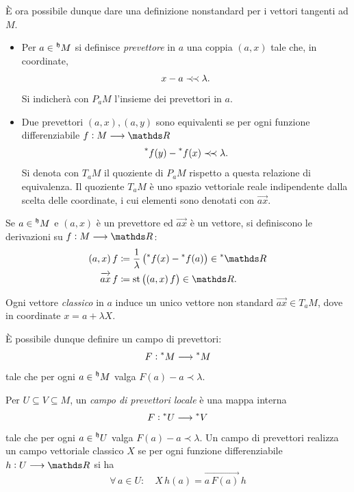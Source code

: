 È ora possibile dunque dare una definizione nonstandard per i vettori tangenti ad $ M $.\begin{itemize}
    \item Per $ a \in \prescript{\mathfrak{h}}{}{M} $ si definisce \emph{prevettore} in $ a $ una coppia $ (a,x) $ tale che, in coordinate, \begin{equation*}
        x-a\mathrel{\prec\! \prec} \lambda.
    \end{equation*}Si indicherà con $ P_{a}M  $ l'insieme dei prevettori in $ a $. 
    \item Due prevettori $ (a,x), (a,y) $ sono equivalenti se per ogni funzione differenziabile $ f: M \longrightarrow \R $ \begin{equation*}
        \prescript{*}{}{f(y)}-\prescript{*}{}{f(x)}\mathrel{\prec\! \prec} \lambda.
    \end{equation*}Si denota con $ T_{a}M $ il quoziente di $ P_{a}M  $ rispetto a questa relazione di equivalenza. Il quoziente $ T_{a}M  $ è uno spazio vettoriale reale indipendente dalla scelta delle coordinate, i cui elementi sono denotati con $ \vec{ax} $.
\end{itemize}

Se $ a \in \prescript{\mathfrak{h}}{}{M} $ e $ (a,x) $ è un prevettore ed $ \vec{ax} $ è un vettore, si definiscono le derivazioni su $ f: M \longrightarrow \R $: \begin{align*}
    (a,x)\,f& \coloneqq \frac{1}{\lambda}\left(\nonstandard{f}(x)-\nonstandard{f}(a)\right) \in \starR\\
\vec{ax} \,f &\coloneqq \st\left((a,x)\,f\right) \in \R.
\end{align*}

Ogni vettore \emph{classico} in $ a $ induce un unico vettore non standard $ \vec{ax} \in T_{a}M $, dove in coordinate $ x = a+ \lambda X $. 

È possibile dunque definire un campo di prevettori: \begin{equation*}
    F: \prescript{*}{}{M} \longrightarrow \prescript{*}{}{M}
\end{equation*}tale che per ogni $ a \in \prescript{\mathfrak{h}}{}{M} $ valga $ F(a) -a\prec \lambda$.

Per $ U \subseteq V \subseteq M $, un \emph{campo di prevettori locale} è una mappa interna \begin{equation*}
    F: \prescript{*}{}{U} \longrightarrow \prescript{*}{}{V}
\end{equation*}tale che per ogni $ a \in \prescript{\mathfrak{h}}{}{U} $ valga $ F(a)-a \prec \lambda$. Un campo di prevettori realizza un campo vettoriale classico $ X $ se per ogni funzione differenziabile $ h: U \longrightarrow \R $ si ha \begin{equation*}
    \forall\, a \in U:\quad X\,h(a) = \vec{a\,F(a)}\,h
\end{equation*}

